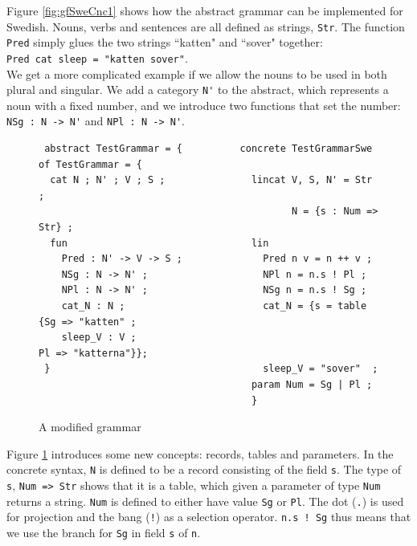 \documentclass{report}
\begin{document}
Figure \ref{fig:gfSweCnc1} shows how the abstract grammar can be implemented
for Swedish. Nouns, verbs and sentences are all defined as strings, \verb|Str|.
The function \verb|Pred| simply glues the two strings ``katten" and ``sover" together:\\
\verb|Pred cat sleep = "katten sover"|.\\
We get a more complicated example if we allow the nouns to be used in both
plural and singular. We add a category \verb|N'| to the
abstract, which represents a noun with a fixed number,
and we introduce two functions that set the number: \verb|NSg : N -> N'| and
\verb|NPl : N -> N'|.
\begin{figure}[h!]
\begin{verbatim}              
 abstract TestGrammar = {          concrete TestGrammarSwe of TestGrammar = {
  cat N ; N' ; V ; S ;               lincat V, S, N' = Str ;
                                            N = {s : Num => Str} ;
  fun                                lin   
    Pred : N' -> V -> S ;              Pred n v = n ++ v ;
    NSg : N -> N' ;                    NPl n = n.s ! Pl ;
    NPl : N -> N' ;                    NSg n = n.s ! Sg ;
    cat_N : N ;                        cat_N = {s = table {Sg => "katten" ;
    sleep_V : V ;                                          Pl => "katterna"}};
 }                                     sleep_V = "sover"  ;
                                     param Num = Sg | Pl ;
                                     }
\end{verbatim}           
\caption{A modified grammar}
\label{fig:gfTest2}
\end{figure}
Figure \ref{fig:gfTest2} introduces some new concepts: records, tables and parameters.
In the concrete syntax, \verb|N| is defined to be a record consisting of the field
\verb|s|. The type of \verb|s|, \verb-Num => Str- shows that it is a table, which given a
parameter of type \verb|Num| returns a string. \verb|Num| is defined 
to either have value \verb|Sg| or \verb|Pl|. 
The dot (\verb-.-) is used for projection and the bang (\verb-!-) as a selection operator.
\verb|n.s ! Sg| thus means that we use the branch for \verb-Sg- in
field \verb|s| of \verb|n|.
\end{document}
